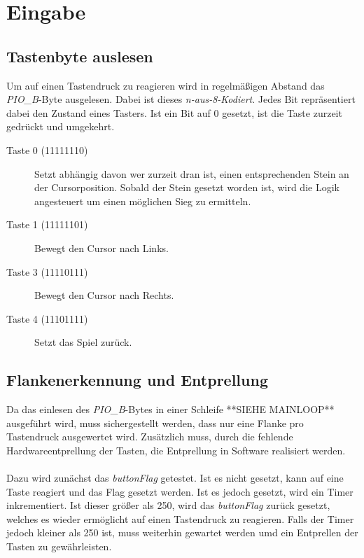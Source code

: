 \newpage
\section{Eingabe}
    \subsection{Tastenbyte auslesen}
        Um auf einen Tastendruck zu reagieren wird in regelmäßigen Abstand das \textit{PIO\_B}-Byte ausgelesen.
        Dabei ist dieses \textit{n-aus-8-Kodiert}. Jedes Bit repräsentiert dabei den Zustand eines Tasters.
        Ist ein Bit auf 0 gesetzt, ist die Taste zurzeit gedrückt und umgekehrt.

        \begin{description}
            \item [Taste 0 (11111110)]
            Setzt abhängig davon wer zurzeit dran ist, einen entsprechenden Stein an der Cursorposition.
            Sobald der Stein gesetzt worden ist, wird die Logik angesteuert um einen möglichen Sieg zu ermitteln.
            \item [Taste 1 (11111101)] Bewegt den Cursor nach Links.
            \item [Taste 3 (11110111)] Bewegt den Cursor nach Rechts.
            \item [Taste 4 (11101111)] Setzt das Spiel zurück.
        \end{description}


    \subsection{Flankenerkennung und Entprellung}
        Da das einlesen des \textit{PIO\_B}-Bytes in einer Schleife **SIEHE MAINLOOP** ausgeführt wird,
        muss sichergestellt werden, dass nur eine Flanke pro Tastendruck ausgewertet wird.
        Zusätzlich muss, durch die fehlende Hardwareentprellung der Tasten, die Entprellung in Software realisiert werden.
        \\
        \\
        Dazu wird zunächst das \textit{buttonFlag} getestet. Ist es nicht gesetzt, kann auf eine Taste reagiert und
        das Flag gesetzt werden. Ist es jedoch gesetzt, wird ein Timer inkrementiert.
        Ist dieser größer als 250, wird das \textit{buttonFlag} zurück gesetzt,
        welches es wieder ermöglicht auf einen Tastendruck zu reagieren.
        Falls der Timer jedoch kleiner als 250 ist, muss weiterhin gewartet werden umd ein Entprellen der Tasten
        zu gewährleisten.

